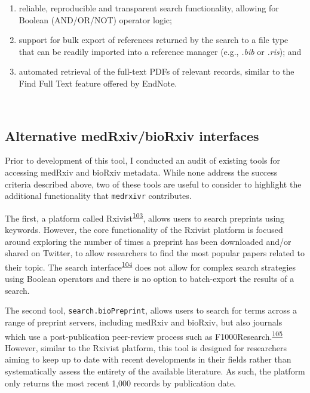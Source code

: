 \documentclass[a4paper, twoside]{templates/ociamthesis}
\begin{document}
\begin{enumerate}
\def\labelenumi{\arabic{enumi}.}
\item
  reliable, reproducible and transparent search functionality, allowing for Boolean (AND/OR/NOT) operator logic;
\item
  support for bulk export of references returned by the search to a file type that can be readily imported into a reference manager (e.g., \emph{.bib} or \emph{.ris}); and
\item
  automated retrieval of the full-text PDFs of relevant records, similar to the Find Full Text feature offered by EndNote.
\end{enumerate}

~

\hypertarget{alternative-medrxivbiorxiv-interfaces}{%
\subsection{Alternative medRxiv/bioRxiv interfaces}\label{alternative-medrxivbiorxiv-interfaces}}

Prior to development of this tool, I conducted an audit of existing tools for accessing medRxiv and bioRxiv metadata. While none address the success criteria described above, two of these tools are useful to consider to highlight the additional functionality that \texttt{medrxivr} contributes.

The first, a platform called Rxivist\textsuperscript{\protect\hyperlink{ref-abdill2019}{103}}, allows users to search preprints using keywords. However, the core functionality of the Rxivist platform is focused around exploring the number of times a preprint has been downloaded and/or shared on Twitter, to allow researchers to find the most popular papers related to their topic. The search interface\textsuperscript{\protect\hyperlink{ref-zotero-15027}{104}} does not allow for complex search strategies using Boolean operators and there is no option to batch-export the results of a search.

The second tool, \texttt{search.bioPreprint}, allows users to search for terms across a range of preprint servers, including medRxiv and bioRxiv, but also journals which use a post-publication peer-review process such as F1000Research.\textsuperscript{\protect\hyperlink{ref-iwema2016}{105}} However, similar to the Rxivist platform, this tool is designed for researchers aiming to keep up to date with recent developments in their fields rather than systematically assess the entirety of the available literature. As such, the platform only returns the most recent 1,000 records by publication date.
\end{document}
